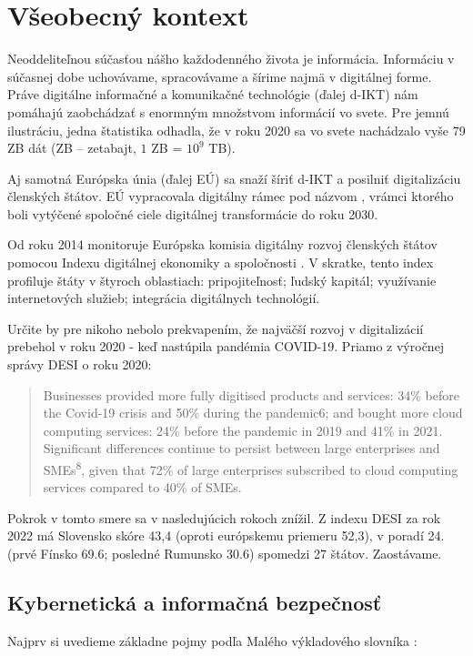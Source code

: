 \chapter{Všeobecný kontext}
Neoddeliteľnou súčasťou nášho každodenného života je informácia. Informáciu v súčasnej dobe uchovávame, spracovávame a 
šírime najmä v digitálnej forme. Práve digitálne informačné a komunikačné technológie (ďalej d-IKT) nám pomáhajú 
zaobchádzať s enormným množstvom informácií vo svete. Pre jemnú ilustráciu, jedna štatistika \cite{STATISTA} odhadla, 
že v roku 2020 sa vo svete nachádzalo vyše 79 ZB dát (ZB -- zetabajt, $1$ ZB = $10^9$ TB).


Aj samotná Európska únia (ďalej EÚ) sa snaží šíriť d-IKT a posilniť digitalizáciu členských štátov. EÚ vypracovala
digitálny rámec pod názvom , vrámci ktorého boli vytýčené spoločné ciele digitálnej 
transformácie do roku 2030.

Od roku 2014 monitoruje Európska komisia digitálny rozvoj členských štátov pomocou Indexu digitálnej ekonomiky a
spoločnosti
\cite{DESI22}. V skratke, tento index profiluje štáty v štyroch oblastiach: pripojiteľnosť; ľudský kapitál; 
využívanie internetových služieb; integrácia digitálnych technológií.

Určite by pre nikoho nebolo prekvapením, že najväčší rozvoj v digitalizácií prebehol v roku 2020 - keď nastúpila pandémia COVID-19.
Priamo z výročnej správy DESI\cite{DESI22} o roku 2020:
\begin{quote}
  Businesses provided more fully digitised products and
  services: 34\% before the Covid-19 crisis and 50\% during the pandemic6; and bought more cloud
  computing services: 24\% before the pandemic in 2019 and 41\% in 2021. Significant differences
  continue to persist between large enterprises and SMEs\textsuperscript{8}, given that 72\% of large enterprises
  subscribed to cloud computing services compared to 40\% of SMEs.
\end{quote}

Pokrok v tomto smere sa v nasledujúcich rokoch znížil. Z indexu DESI\cite{DESI22} za rok 2022  má Slovensko skóre 43,4
(oproti európskemu priemeru 52,3), v poradí 24. (prvé Fínsko 69.6; posledné Rumunsko 30.6) spomedzi 27 štátov. Zaostávame.

\section{Kybernetická a informačná bezpečnosť}
Najprv si uvedieme základne pojmy podľa Malého výkladového slovníka \cite{KUDIaKB-MVS}: \\

